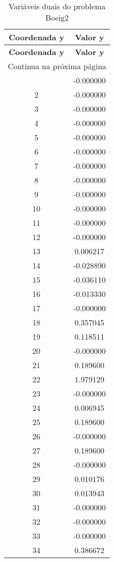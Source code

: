 \documentclass[12pt]{article}
\begin{document}
\begin{longtable}{@{}cc@{}}
\caption{Variáveis duais do problema Boeig2} \\
\toprule
\textbf{Coordenada y} & \textbf{Valor y} \\
\midrule
\endfirsthead

\toprule
\textbf{Coordenada y} & \textbf{Valor y} \\
\midrule
\endhead

\midrule \multicolumn{2}{r}{{Continua na próxima página}} \\ \midrule
\endfoot

\bottomrule
\endlastfoot
1 & -0.000000 \\
2 & -0.000000 \\
3 & -0.000000 \\
4 & -0.000000 \\
5 & -0.000000 \\
6 & -0.000000 \\
7 & -0.000000 \\
8 & -0.000000 \\
9 & -0.000000 \\
10 & -0.000000 \\
11 & -0.000000 \\
12 & -0.000000 \\
13 & 0.006217 \\
14 & -0.028890 \\
15 & -0.036110 \\
16 & -0.013330 \\
17 & -0.000000 \\
18 & 0.357045 \\
19 & 0.118511 \\
20 & -0.000000 \\
21 & 0.189600 \\
22 & 1.979129 \\
23 & -0.000000 \\
24 & 0.006945 \\
25 & 0.189600 \\
26 & -0.000000 \\
27 & 0.189600 \\
28 & -0.000000 \\
29 & 0.010176 \\
30 & 0.013943 \\
31 & -0.000000 \\
32 & -0.000000 \\
33 & -0.000000 \\
34 & 0.386672 \\

\end{longtable}
\end{document}
